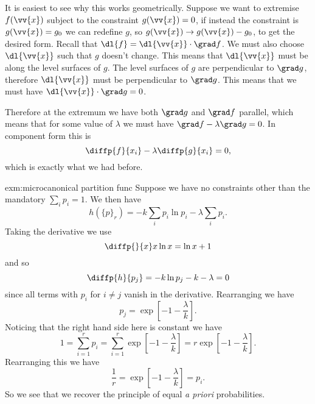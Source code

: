 \documentclass[fleqn]{NotesClass}
\begin{document}
    It is easiest to see why this works geometrically.
    Suppose we want to extremise \(f(\vv{x})\) subject to the constraint \(g(\vv{x}) = 0\), if instead the constraint is \(g(\vv{x}) = g_0\) we can redefine \(g\), so \(g(\vv{x}) \to g(\vv{x}) - g_0\), to get the desired form.
    Recall that \(\dl{f} = \dl{\vv{x}} \cdot \grad f\).
    We must also choose \(\dl{\vv{x}}\) such that \(g\) doesn't change.
    This means that \(\dl{\vv{x}}\) must be along the level surfaces of \(g\).
    The level surfaces of \(g\) are perpendicular to \(\grad g\), therefore \(\dl{\vv{x}}\) must be perpendicular to \(\grad g\).
    This means that we must have \(\dl{\vv{x}} \cdot \grad g = 0\).
    
    Therefore at the extremum we have both \(\grad g\) and \(\grad f\) parallel, which means that for some value of \(\lambda\) we must have \(\grad f - \lambda \grad g = 0\).
    In component form this is
    \begin{equation}
        \diffp{f}{x_i} - \lambda \diffp{g}{x_i} = 0,
    \end{equation}
    which is exactly what we had before.
    
    \begin{exm}{}{exm:microcanonical partition func}
        Suppose we have no constraints other than the mandatory \(\sum_i p_i = 1\).
        We then have
        \begin{equation}
            h(\{p\}_r) = -k \sum_i p_i \ln p_i - \lambda \sum_i p_i.
        \end{equation}
        Taking the derivative we use
        \begin{equation}
            \diffp{}{x} x \ln x = \ln x + 1
        \end{equation}
        and so
        \begin{equation}
            \diffp{h}{p_j} = -k\ln p_j - k - \lambda = 0
        \end{equation}
        since all terms with \(p_i\) for \(i \ne j\) vanish in the derivative.
        Rearranging we have
        \begin{equation}
            p_j = \exp\left[ -1 - \frac{\lambda}{k} \right].
        \end{equation}
        Noticing that the right hand side here is constant we have
        \begin{equation}
            1 = \sum_{i=1}^{r} p_i = \sum_{i=1}^{r} \exp\left[ -1 - \frac{\lambda}{k} \right] = r\exp\left[ -1 - \frac{\lambda}{k} \right].
        \end{equation}
        Rearranging this we have
        \begin{equation}
            \frac{1}{r} = \exp\left[ -1 - \frac{\lambda}{k} \right] = p_i.
        \end{equation}
        So we see that we recover the principle of equal \textit{a priori} probabilities.
    \end{exm}
    
\end{document}
